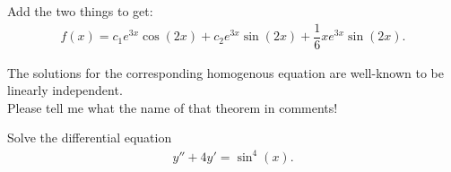 \documentclass[11pt]{article}
\begin{document}
        \begin{solution}[Finish.]
            Add the two things to get:
            \begin{align}
                \boxed{f(x) = c_1e^{3x}\cos(2x) + c_2e^{3x}\sin(2x) + \dfrac{1}{6}xe^{3x}\sin(2x).}
            \end{align}
        \end{solution}
        \begin{remark*}
            The solutions for the corresponding homogenous equation are well-known to be linearly independent. \\
            Please tell me what the name of that theorem in comments!
        \end{remark*}
        \newpage
        \begin{problem}[Problem 2]
            Solve the differential equation 
            \begin{align}
                y'' + 4y' = \sin^4(x).
            \end{align}
        \end{problem}
\end{document}
